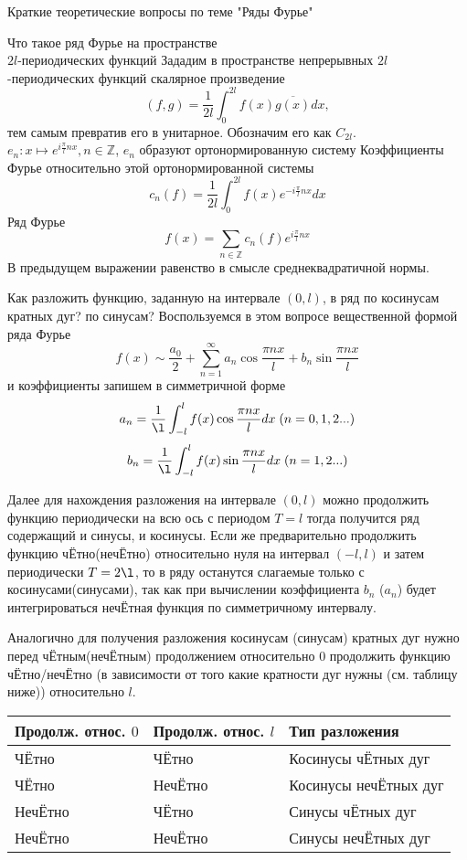 \documentclass{article}
\begin{document}
\begin{section}{Краткие теоретические вопросы по теме "Ряды Фурье"}
\begin{subsection}{Что такое ряд Фурье на пространстве\\$2l$-периодических функций}
Зададим в пространстве непрерывных $2l$-периодических функций скалярное произведение
\[(f, g) = \frac{1}{2l}\int_0^{2l}f(x)\overline{g(x)}dx,\]
тем самым превратив его в унитарное. Обозначим его как $C_{2l}$.\\

$e_n: x \mapsto e^{i\frac{\pi}{l}nx}, n \in \mathbb{Z}$, $e_n$ образуют ортонормированную систему
Коэффициенты Фурье относительно этой ортонормированной системы
\[c_n(f) = \frac{1}{2l} \int_0^{2l}f(x)e^{-i\frac{\pi}{l}nx}dx\]
Ряд Фурье 
\[f(x) = \sum_{n \in \mathbb{Z}} c_n(f)e^{i\frac{\pi}{l}nx}\]
В предыдущем выражении равенство в смысле среднеквадратичной нормы.
\end{subsection}


\begin{subsection}{Как разложить функцию, заданную на интервале $(0, l)$, в ряд по косинусам кратных дуг? по синусам?}
Воспользуемся в этом вопросе вещественной формой ряда Фурье
\[f(x) \sim \frac{a_0}{2}+\sum_{n=1}^{\infty}a_n \cos \frac{\pi nx}{l} +b_n \sin \frac{\pi nx}{l}\]
и коэффициенты запишем в симметричной форме
\[a_n = \frac{1}{\l}\int_{-l}^l f(x)\cos \frac{\pi nx}{l} dx\; (n = 0, 1, 2 ...)\]
\[b_n = \frac{1}{\l}\int_{-l}^l f(x)\sin \frac{\pi nx}{l} dx\; (n = 1, 2 ...)\]

Далее для нахождения разложения на интервале $(0, l)$ можно продолжить функцию периодически на всю ось с периодом $T = l$ тогда получится ряд содержащий и синусы, и косинусы. Если же предварительно продолжить функцию чЁтно(нечЁтно) относительно нуля на интервал $ (-l, l) $ и затем периодически $T = 2\l$, то в ряду останутся слагаемые только с косинусами(синусами), так как при вычислении коэффициента $ b_n $ ($a_n$) будет интегрироваться нечЁтная функция по симметричному интервалу.

Аналогично для получения разложения косинусам (синусам) кратных дуг нужно перед чЁтным(нечЁтным) продолжением относительно 0 продолжить функцию чЁтно/нечЁтно (в зависимости от того какие кратности дуг нужны (см. таблицу ниже)) относительно $l$.

\begin{table}[h]
	\begin{tabular}{|l|l|l|}
		\hline
		Продолж. относ. $0$     & Продолж. относ. $l$ 	& Тип разложения        \\ \hline
		ЧЁтно                        & ЧЁтно                        & Косинусы чЁтных дуг   \\ \hline
		ЧЁтно                        & НечЁтно                      & Косинусы нечЁтных дуг \\ \hline
		НечЁтно                      & ЧЁтно                        & Синусы чЁтных дуг     \\ \hline
		НечЁтно                      & НечЁтно                      & Синусы нечЁтных дуг   \\ \hline
	\end{tabular}
\end{table}


\end{subsection}
\end{section}
\end{document}
